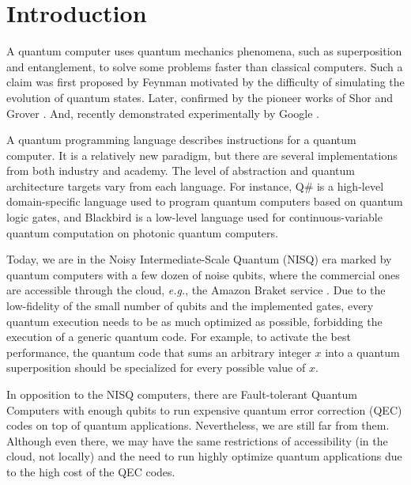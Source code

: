 \documentclass[preprint,3p,times,twocolumn]{elsarticle}
\begin{document}
\section{Introduction}

A quantum computer uses quantum mechanics phenomena, such as superposition and
entanglement, to solve some problems faster than classical computers. Such a
claim was first proposed by Feynman \cite{Feynman1982} motivated by the
difficulty of simulating the evolution of quantum states. Later, confirmed by
the pioneer works of Shor \cite{Shor1997} and Grover \cite{Grover1997}. And,
recently demonstrated experimentally by Google \cite{Arute2019}. 

A quantum programming language describes instructions for a quantum computer.
It is a relatively new paradigm, but there are several implementations
\cite{Cross2017,Svore2018,Fu2019,Killoran2019,Khammassi2018,Heckey2015,
Javadiabhari2015,Smith2016,Steiger2018,Green2013,Wecker2014,Lapets2013} from
both industry and academy. The level of abstraction and quantum architecture
targets vary from each language. For instance, Q\# \cite{Svore2018} is a
high-level domain-specific language used to program quantum computers based on
quantum logic gates, and Blackbird \cite{Killoran2019} is a low-level language
used for continuous-variable quantum computation on photonic quantum computers. 

Today, we are in the Noisy Intermediate-Scale Quantum (NISQ) era
\cite{Preskill2018} marked by quantum computers with a few dozen of noise
qubits, where the commercial ones are accessible through the cloud,
\textit{e.g.}, the Amazon Braket service \cite{amazon}. Due to the low-fidelity
of the small number of qubits and the implemented gates, every quantum
execution needs to be as much optimized as possible, forbidding the execution
of a generic quantum code.  For example, to activate the best performance, the
quantum code that sums an arbitrary integer $x$ into a quantum superposition
should be specialized for every possible value of $x$.

In opposition to the NISQ computers, there are Fault-tolerant Quantum Computers
\cite{Devitt2013} with enough qubits to run expensive quantum error correction
(QEC) codes \cite{Devitt2013} on top of quantum applications. Nevertheless, we
are still far from them. Although even there, we may have the same restrictions
of accessibility (in the cloud, not locally) and the need to run highly
optimize quantum applications due to the high cost of the QEC codes. 
\end{document}
